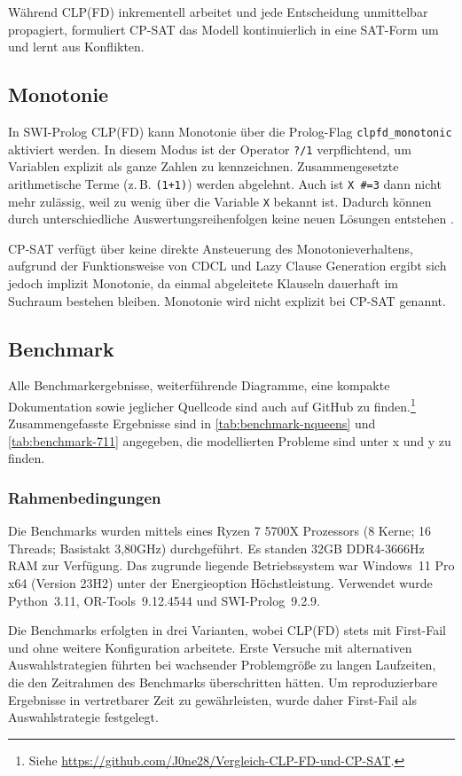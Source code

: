 \documentclass[12pt,a4paper]{article}
\begin{document}
Während CLP(FD) inkrementell arbeitet und jede Entscheidung unmittelbar propagiert, formuliert CP-SAT das Modell kontinuierlich in eine SAT-Form um und lernt aus Konflikten.
\subsection{Monotonie}
\label{sec:monotonie}
In SWI-Prolog CLP(FD) kann Monotonie über die Prolog-Flag \texttt{clpfd\_monotonic} aktiviert werden.  
In diesem Modus ist der Operator \texttt{?/1} verpflichtend, um Variablen explizit als ganze Zahlen zu kennzeichnen.
Zusammengesetzte arithmetische Terme (z.\,B. \texttt{(1+1)}) werden abgelehnt.
Auch ist \texttt{X \#=3} dann nicht mehr zulässig, weil zu wenig über die Variable \texttt{X} bekannt ist.   
Dadurch können durch unterschiedliche Auswertungsreihenfolgen keine neuen Lösungen entstehen \cite{swi-clpfd-doc}.

CP-SAT verfügt über keine direkte Ansteuerung des Monotonieverhaltens, aufgrund der Funktionsweise von CDCL und Lazy Clause Generation ergibt sich jedoch implizit Monotonie, da einmal abgeleitete Klauseln dauerhaft im Suchraum bestehen bleiben.
Monotonie wird nicht explizit bei CP-SAT genannt.
\subsection{Benchmark}
Alle Benchmarkergebnisse, weiterführende Diagramme, eine kompakte Dokumentation sowie jeglicher Quellcode sind auch auf GitHub zu finden.\footnote{Siehe \url{https://github.com/J0ne28/Vergleich-CLP-FD-und-CP-SAT}.}
Zusammengefasste Ergebnisse sind in \autoref{tab:benchmark-nqueens} und \autoref{tab:benchmark-711} angegeben, die modellierten Probleme sind unter x und y zu finden.
\label{sec:performance}
\subsubsection{Rahmenbedingungen}
Die Benchmarks wurden mittels eines Ryzen 7 5700X Prozessors (8 Kerne; 16 Threads; Basistakt 3,80GHz) durchgeführt.
Es standen 32GB DDR4-3666Hz RAM zur Verfügung.
Das zugrunde liegende Betriebssystem war Windows~11 Pro x64 (Version 23H2) unter der Energieoption \glqq Höchstleistung\grqq.
Verwendet wurde Python~3.11, OR-Tools~9.12.4544 und SWI-Prolog~9.2.9.

Die Benchmarks erfolgten in drei Varianten, wobei CLP(FD) stets mit First-Fail und ohne weitere Konfiguration arbeitete. 
Erste Versuche mit alternativen Auswahlstrategien führten bei wachsender Problemgröße zu langen Laufzeiten, die den Zeitrahmen des Benchmarks überschritten hätten.
Um reproduzierbare Ergebnisse in vertretbarer Zeit zu gewährleisten, wurde daher First-Fail als Auswahlstrategie festgelegt.
\end{document}
